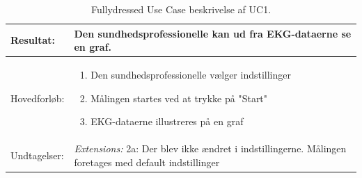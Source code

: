 \begin{table}[H]
\begin{tabularx}{\textwidth}{l X}
     Resultat:              & 	Den sundhedsprofessionelle kan ud fra EKG-dataerne se en graf.                                                                                                                                                                                                                                                                                                                                                                                                                                                                                                                                                   \\ \midrule \addlinespace[1mm]                                                                                                                                                       
     Hovedforløb:           &  \begin{enumerate}
     						   \item Den sundhedsprofessionelle vælger indstillinger
\newline						[Extension 2a: Den sundhedsprofessioneller er tilfreds med default-indstillingerne]
     						   \item Målingen startes ved at trykke på "Start"
		   				   	   \item EKG-dataerne illustreres på en graf
     						   \end{enumerate}
\\ \midrule 
 	Undtagelser:           & \textit{Extensions:}
\newline					 2a: Der blev ikke ændret i indstillingerne. Målingen foretages med default indstillinger 
\\ \bottomrule
    \end{tabularx}
    \caption {Fullydressed Use Case beskrivelse af UC1.}
    \label{tab:UC1}
\end{table}




